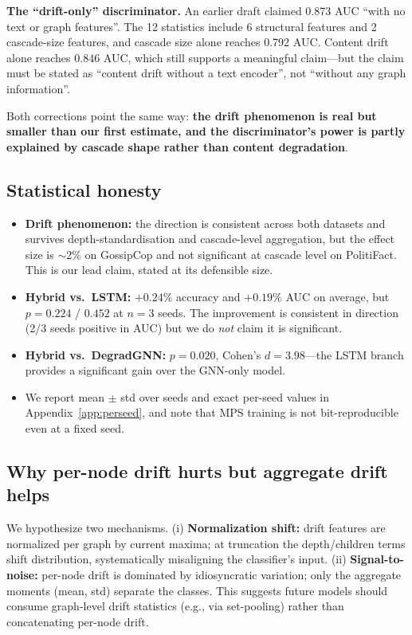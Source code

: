 \documentclass[10pt,twocolumn]{article}
\begin{document}
\textbf{The ``drift-only'' discriminator.} An earlier draft claimed 0.873 AUC
``with no text or graph features''. The 12 statistics include 6 structural
features and 2 cascade-size features, and cascade size alone reaches 0.792 AUC.
Content drift alone reaches 0.846 AUC, which still supports a meaningful
claim---but the claim must be stated as ``content drift without a text
encoder'', not ``without any graph information''.

Both corrections point the same way: \textbf{the drift phenomenon is real but
smaller than our first estimate, and the discriminator's power is partly
explained by cascade shape rather than content degradation}.

\subsection{Statistical honesty}
\label{sec:stats}
\begin{itemize}[leftmargin=*,itemsep=2pt]
\item \textbf{Drift phenomenon:} the direction is consistent across both
datasets and survives depth-standardisation and cascade-level aggregation, but
the effect size is $\sim$2\% on GossipCop and not significant at cascade level
on PolitiFact. This is our lead claim, stated at its defensible size.
\item \textbf{Hybrid vs.\ LSTM:} $+0.24\%$ accuracy and $+0.19\%$ AUC on
average, but $p=0.224$ / $0.452$ at $n=3$ seeds. The improvement is consistent
in direction (2/3 seeds positive in AUC) but we do \emph{not} claim it is
significant.
\item \textbf{Hybrid vs.\ DegradGNN:} $p=0.020$, Cohen's $d=3.98$---the LSTM
branch provides a significant gain over the GNN-only model.
\item We report mean $\pm$ std over seeds and exact per-seed values in
Appendix~\ref{app:perseed}, and note that MPS training is not bit-reproducible
even at a fixed seed.
\end{itemize}

\subsection{Why per-node drift hurts but aggregate drift helps}
\label{sec:why}
We hypothesize two mechanisms. (i) \textbf{Normalization shift:} drift features
are normalized per graph by current maxima; at truncation the depth/children
terms shift distribution, systematically misaligning the classifier's input.
(ii) \textbf{Signal-to-noise:} per-node drift is dominated by idiosyncratic
variation; only the aggregate moments (mean, std) separate the classes. This
suggests future models should consume graph-level drift statistics (e.g., via
set-pooling) rather than concatenating per-node drift.
\end{document}
